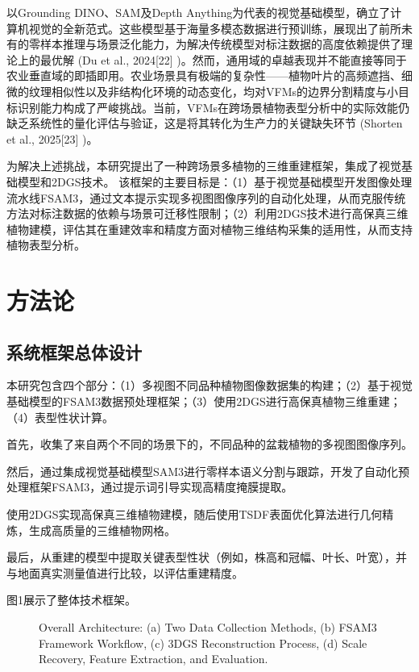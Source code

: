 \documentclass[preprint,12pt]{elsarticle}
\begin{document}
以Grounding DINO、SAM及Depth Anything为代表的视觉基础模型，确立了计算机视觉的全新范式。这些模型基于海量多模态数据进行预训练，展现出了前所未有的零样本推理与场景泛化能力，为解决传统模型对标注数据的高度依赖提供了理论上的最优解 (Du et al., 2024[22] )。然而，通用域的卓越表现并不能直接等同于农业垂直域的即插即用。农业场景具有极端的复杂性——植物叶片的高频遮挡、细微的纹理相似性以及非结构化环境的动态变化，均对VFMs的边界分割精度与小目标识别能力构成了严峻挑战。当前，VFMs在跨场景植物表型分析中的实际效能仍缺乏系统性的量化评估与验证，这是将其转化为生产力的关键缺失环节 (Shorten et al., 2025[23] )。

为解决上述挑战，本研究提出了一种跨场景多植物的三维重建框架，集成了视觉基础模型和2DGS技术。 该框架的主要目标是：（1）基于视觉基础模型开发图像处理流水线FSAM3，通过文本提示实现多视图图像序列的自动化处理，从而克服传统方法对标注数据的依赖与场景可迁移性限制；（2）利用2DGS技术进行高保真三维植物建模，评估其在重建效率和精度方面对植物三维结构采集的适用性，从而支持植物表型分析。

\section{方法论}

\subsection{系统框架总体设计}

本研究包含四个部分：（1）多视图不同品种植物图像数据集的构建；（2）基于视觉基础模型的FSAM3数据预处理框架；（3）使用2DGS进行高保真植物三维重建；（4）表型性状计算。

首先，收集了来自两个不同的场景下的，不同品种的盆栽植物的多视图图像序列。

然后，通过集成视觉基础模型SAM3进行零样本语义分割与跟踪，开发了自动化预处理框架FSAM3，通过提示词引导实现高精度掩膜提取。

使用2DGS实现高保真三维植物建模，随后使用TSDF表面优化算法进行几何精炼，生成高质量的三维植物网格。

最后，从重建的模型中提取关键表型性状（例如，株高和冠幅、叶长、叶宽），并与地面真实测量值进行比较，以评估重建精度。

图1展示了整体技术框架。

\begin{figure}[t]
\centering
\caption{Overall Architecture: (a) Two Data Collection Methods, (b) FSAM3 Framework Workflow, (c) 3DGS Reconstruction Process, (d) Scale Recovery, Feature Extraction, and Evaluation.}
\label{fig:image1}
\end{figure}
\end{document}

